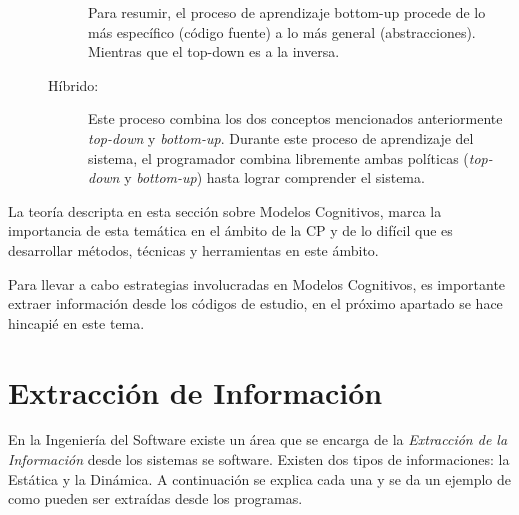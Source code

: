 \begin{description}
\begin{description}
Para resumir, el proceso de aprendizaje bottom-up procede de lo más específico (código fuente) a lo más general (abstracciones). Mientras que el top-down es a la inversa.

\item[Híbrido:] Este proceso combina los dos conceptos mencionados anteriormente \textit{top-down} y \textit{bottom-up}. Durante este proceso de aprendizaje del sistema, el programador combina libremente ambas políticas (\textit{top-down} y \textit{bottom-up}) hasta lograr comprender el sistema.
\end{description}
\end{description}


La teoría descripta en esta sección sobre Modelos Cognitivos, marca la importancia de esta temática en el ámbito de la CP y de lo difícil que es desarrollar métodos, técnicas y herramientas en este ámbito.

Para llevar a cabo estrategias involucradas en Modelos Cognitivos, es importante extraer información desde los códigos de estudio, en el próximo apartado se hace hincapié en este tema.

\section{Extracción de Información}

En la Ingeniería del Software existe un área que se encarga de la \textit{Extracción de la Información} desde los sistemas se software. 
Existen dos tipos de informaciones: la Estática y la Dinámica. A continuación se explica cada una y se da un ejemplo de como pueden ser extraídas desde los programas.

